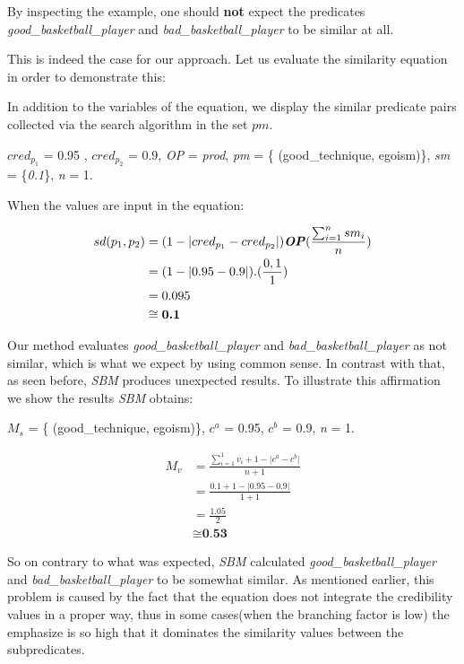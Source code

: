 By inspecting the example, one should \textbf{not} expect the predicates \textit{good\_basketball\_player} and \textit{bad\_basketball\_player} to be similar at all.

This is indeed the case for our approach.  Let us evaluate the similarity equation in order to demonstrate this:

In addition to the variables of the equation, we display the similar predicate pairs collected via the search algorithm in the set $pm$.

$cred_{p_{1}}$ = 0.95 , $cred_{p_{2}}$ = 0.9,  \emph{OP} = \textit{prod},  \textit{pm} = \{ (good\_technique, egoism)\},  \textit{sm} = \{\textit{0.1}\}, \textit{n} = 1.

When the values are input in the equation:


\begin{equation}\label{eq:sdE2}
\begin{split}
\textit{$sd(p_{1}, p_{2})$} &=   (1-\lvert  \textit{$cred_{p_{1}}$} - \textit{$cred_{p_{2}}$}  \rvert) \textbf{\emph{OP}} (\frac{\sum_{i=1}^{n} sm_i}{n})\\
&=   (1-\lvert  0.95 - 0.9  \rvert) . (\frac{0,1}{1}) \\
&= 0.095\\
&\cong{\textbf{0.1}}
 \end{split} 
\end{equation}

Our method evaluates  \textit{good\_basketball\_player} and \textit{bad\_basketball\_player}  as not similar, which is what we expect by using common sense. In contrast with that, as seen before, \textit{SBM} produces unexpected results. To illustrate this affirmation we show the results \textit{SBM} obtains:

$M_{s}$ = \{ (good\_technique, egoism)\}, $c^a$ = 0.95, $c^b$ = 0.9,   \textit{n} = 1.     

\begin{equation}\label{eq:sbmE2}
\begin{split}
M_v &=\frac{\sum_{i=1}^{1} v_i+1-\lvert c^a-c^b\rvert}{n+1}\\
&=\frac{0.1 +1-\lvert 0.95 - 0.9\rvert}{1+1}\\
&= \frac{1.05}{2}\\
&\cong{\textbf{0.53}}
 \end{split} 
\end{equation}

So on contrary to what was expected, \textit{SBM} calculated \textit{good\_basketball\_player} and \linebreak[4] \textit{bad\_basketball\_player} to be somewhat similar. As mentioned earlier, this problem is caused by the fact that the equation does not integrate the credibility values in a proper way, thus in some cases(when the branching factor is low) the emphasize is so high that it dominates the similarity values between the subpredicates. 

